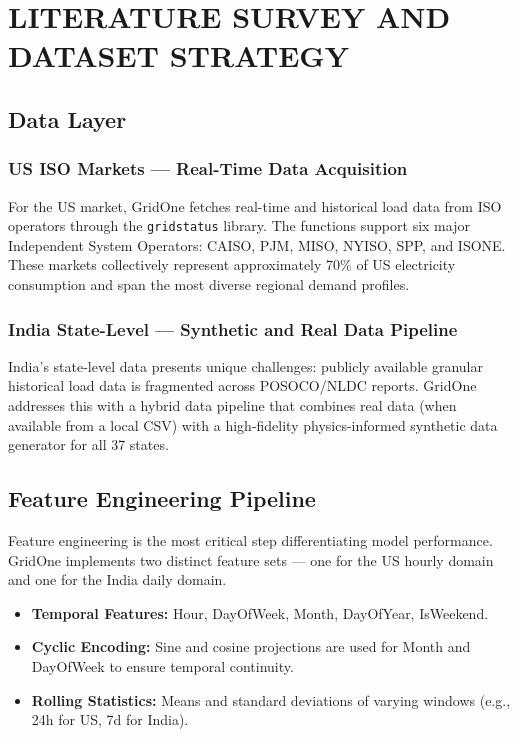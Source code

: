\documentclass[ 12pt,a4paper,twocolumn,fleqn]{report}
\begin{document}
\newpage
  \pagestyle{fancy}
\thisfancypage{%
  \setlength{\fboxsep}{20pt}\doublebox}{}
\normalsize
\chapter{LITERATURE SURVEY AND DATASET STRATEGY}
\section{Data Layer}
\vspace{2mm}
\subsection{US ISO Markets — Real-Time Data Acquisition}
For the US market, GridOne fetches real-time and historical load data from ISO operators through the \texttt{gridstatus} library. The functions support six major Independent System Operators: CAISO, PJM, MISO, NYISO, SPP, and ISONE. These markets collectively represent approximately 70\% of US electricity consumption and span the most diverse regional demand profiles.

\subsection{India State-Level — Synthetic and Real Data Pipeline}
India's state-level data presents unique challenges: publicly available granular historical load data is fragmented across POSOCO/NLDC reports. GridOne addresses this with a hybrid data pipeline that combines real data (when available from a local CSV) with a high-fidelity physics-informed synthetic data generator for all 37 states.

\section{Feature Engineering Pipeline}
\vspace{2mm}
Feature engineering is the most critical step differentiating model performance. GridOne implements two distinct feature sets — one for the US hourly domain and one for the India daily domain.
\begin{itemize}
    \item \textbf{Temporal Features:} Hour, DayOfWeek, Month, DayOfYear, IsWeekend.
    \item \textbf{Cyclic Encoding:} Sine and cosine projections are used for Month and DayOfWeek to ensure temporal continuity.
    \item \textbf{Rolling Statistics:} Means and standard deviations of varying windows (e.g., 24h for US, 7d for India).
\end{itemize}
\end{document}
